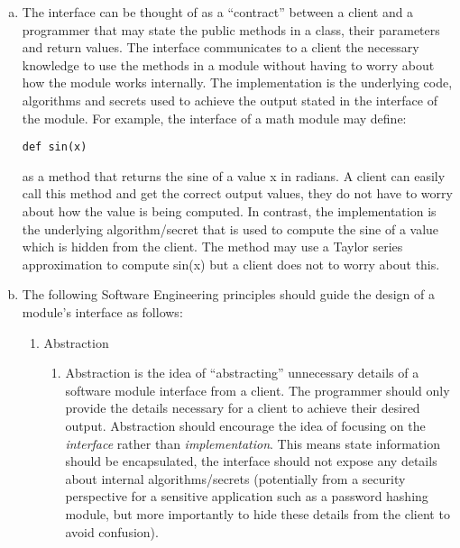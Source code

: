 \documentclass[12pt]{article}
\begin{document}
\begin{enumerate}[a)]
\item The interface can be thought of as a ``contract'' between a client and a programmer that may state the public methods in a class, their parameters and return values. The interface communicates to a client the necessary knowledge to use the methods in a module without having to worry about how the module works internally. The implementation is the underlying code, algorithms and secrets used to achieve the output stated in the interface of the module. For example, the interface of a math module may define: \begin{verbatim}
def sin(x)
\end{verbatim} as a method that returns the sine of a value x in radians. A client can easily call this method and get the correct output values, they do not have to worry about how the value is being computed. In contrast, the implementation is the underlying algorithm/secret that is used to compute the sine of a value which is hidden from the client. The method may use a Taylor series approximation to compute sin(x) but a client does not to worry about this.

\item The following Software Engineering principles should guide the design of a module's interface as follows:
	\begin{enumerate}
	
		\item Abstraction
			\begin{enumerate}
					\item Abstraction is the idea of ``abstracting'' unnecessary details of a software module interface from a client. The programmer should only provide the details necessary for a client to achieve their desired output. Abstraction should encourage the idea of focusing on the \emph{interface} rather than \emph{implementation}. This means state information should be encapsulated, the interface should not expose any details about internal algorithms/secrets (potentially from a security perspective for a sensitive application such as a password hashing module, but more importantly to hide these details from the client to avoid confusion).
			\end{enumerate}
			

\end{enumerate}
\end{enumerate}
\end{document}
